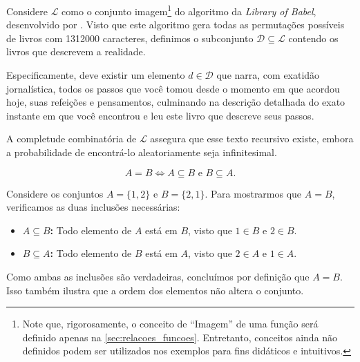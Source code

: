 \begin{exemplo}
    \label{ex:ordem_elementos_dupla_inclusao}
    Considere \(\mathscr{L}\) como o conjunto imagem\footnote{Note que, rigorosamente, o conceito de ``Imagem''  de uma função será definido apenas na \autoref{sec:relacoes_funcoes}. Entretanto, conceitos ainda não definidos podem ser utilizados nos exemplos para fins didáticos e intuitivos.} do algoritmo da \textit{Library of Babel}, desenvolvido por \textcite{basile2015}.
    Visto que este algoritmo gera todas as permutações possíveis de livros com 1312000 caracteres, definimos o subconjunto \(\mathscr{D} \subseteq \mathscr{L}\) contendo os livros que descrevem a realidade.

    Especificamente, deve existir um elemento \(d \in \mathscr{D}\) que narra, com exatidão jornalística, todos os passos que você tomou desde o momento em que acordou hoje, suas refeições e pensamentos, culminando na descrição detalhada do exato instante em que você encontrou e leu este livro que descreve seus passos.

    A completude combinatória de \(\mathscr{L}\) assegura que esse texto recursivo existe, embora a probabilidade de encontrá-lo aleatoriamente seja infinitesimal.
\end{exemplo}

\begin{definicao}
    \label{def:igualdade_conjuntos}
    \[A = B \iff A \subseteq B \text{ e } B \subseteq A.\]
\end{definicao}



\begin{exemplo}
    Considere os conjuntos \(A = \{1, 2\}\) e \(B = \{2, 1\}\). Para mostrarmos que \(A = B\), verificamos as duas inclusões necessárias:
    \begin{itemize}
        \item \textbf{\(A \subseteq B\):} Todo elemento de \(A\) está em \(B\), visto que \(1 \in B\) e \(2 \in B\).
        \item \textbf{\(B \subseteq A\):} Todo elemento de \(B\) está em \(A\), visto que \(2 \in A\) e \(1 \in A\).
    \end{itemize}
    Como ambas as inclusões são verdadeiras, concluímos por definição que \(A = B\). Isso também ilustra que a ordem dos elementos não altera o conjunto.
\end{exemplo}

